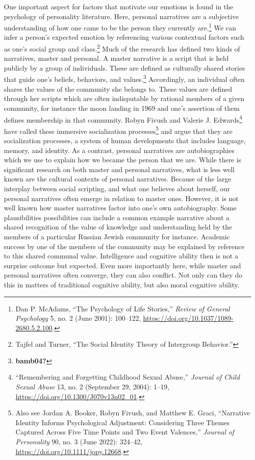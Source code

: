 \documentclass[
  12pt,
]{book}
\theoremstyle{definition}
\theoremstyle{definition}
\theoremstyle{definition}
\theoremstyle{definition}
\theoremstyle{remark}
\begin{document}
One important aspect for factors that motivate our emotions is found in the psychology of personality literature. Here, personal narratives are a subjective understanding of how one came to be the person they currently are.\footnote{Dan P. McAdams, {``The {Psychology} of {Life Stories},''} \emph{Review of General Psychology} 5, no. 2 (June 2001): 100--122, \url{https://doi.org/10.1037/1089-2680.5.2.100}.} We can infer a person's expected emotion by referencing various contextual factors such as one's social group and class.\footnote{Tajfel and Turner, {``The {Social Identity Theory} of {Intergroup Behavior}.''}} Much of the research has defined two kinds of narratives, master and personal. A master narrative is a script that is held publicly by a group of individuals. These are defined as culturally shared stories that guide one's beliefs, behaviors, and values.\footnote{\textbf{bamb04?}} Accordingly, an individual often shares the values of the community she belongs to. These values are defined through her scripts which are often indisputable by rational members of a given community, for instance the moon landing in 1969 and one's assertion of them defines membership in that community. Robyn Fivush and Valerie J. Edwards\footnote{{``Remembering and {Forgetting Childhood Sexual Abuse},''} \emph{Journal of Child Sexual Abuse} 13, no. 2 (September 29, 2004): 1--19, \url{https://doi.org/10.1300/J070v13n02_01}.} have called these immersive socialization processes\footnote{Also see Jordan A. Booker, Robyn Fivush, and Matthew E. Graci, {``Narrative {Identity Informs Psychological Adjustment}: {Considering} Three Themes Captured Across Five Time Points and Two Event Valences,''} \emph{Journal of Personality} 90, no. 3 (June 2022): 324--42, \url{https://doi.org/10.1111/jopy.12668}.} and argue that they are socialization processes, a system of human developments that includes language, memory, and identity. As a contrast, personal narratives are autobiographies which we use to explain how we became the person that we are. While there is significant research on both master and personal narratives, what is less well known are the cultural contexts of personal narratives. Because of the large interplay between social scripting, and what one believes about herself, our personal narratives often emerge in relation to master ones. However, it is not well known how master narratives factor into one's own autobiography. Some plausibilities possibilities can include a common example narrative about a shared recognition of the value of knowledge and understanding held by the members of a particular Russian Jewish community for instance. Academic success by one of the members of the community may be explained by reference to this shared communal value. Intelligence and cognitive ability then is not a surprise outcome but expected. Even more importantly here, while master and personal narratives often converge, they can also conflict. Not only can they do this in matters of traditional cognitive ability, but also moral cognitive ability.
\end{document}
